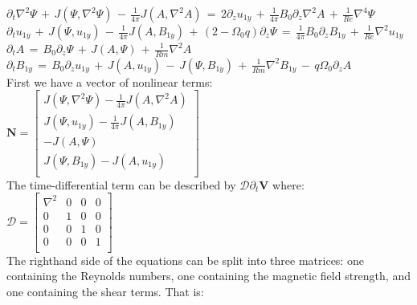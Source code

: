 \documentclass[letterpaper,12pt]{article}
\newcommand\reye{\mathrel{Re}}
\newcommand\reym{\mathrel{Rm}}
\begin{document}
$\partial_t \nabla^2 \Psi \, + \, J\left(\Psi, \nabla^2 \Psi\right) \, - \, \frac{1}{4\pi}J\left(A, \nabla^2 A \right) \, =  \, 2 \partial_z u_{1y} \,+ \, \frac{1}{4\pi} B_0 \partial_z \nabla^2 A \, + \, \frac{1}{\reye}\nabla^4 \Psi$ \\

$\partial_t u_{1y} \, + \, J\left(\Psi, u_{1y}\right) \, - \, \frac{1}{4\pi} J\left(A, B_{1y}\right) \, + \, \left(2 - \Omega_0 q\right) \partial_z \Psi \, = \, \frac{1}{4\pi}B_0\partial_z B_{1y} \, + \, \frac{1}{\reye} \nabla^2 u_{1y}$ \\

$\partial_t A \, = \, B_0 \partial_z \Psi \, + \, J\left(A, \Psi\right) \, + \, \frac{1}{Rm} \nabla^2 A$ \\

$\partial_t B_{1y} \, = \, B_0 \partial_z u_{1y} \, + \, J\left(A, u_{1y}\right) \, - \, J\left(\Psi, B_{1y}\right) \, + \, \frac{1}{\reym} \nabla^2 B_{1y}  \, - \, q \Omega_0 \partial_z A$ \\

First we have a vector of nonlinear terms:\\

$\mathbf{N} = \left[ \begin{matrix}  J(\Psi, \nabla^2 \Psi) - \frac{1}{4\pi}J(A, \nabla^2 A)\\
J(\Psi, u_{1y}) - \frac{1}{4\pi} J(A, B_{1y}) \\ 
-J(A, \Psi) \\
J(\Psi, B_{1y}) - J(A, u_{1y}) \\
\end{matrix} \right]$ \\

The time-differential term can be described by $\mathcal{D}\partial_t \mathbf{V}$ where: \\

$\mathcal{D} = \left[\begin{matrix}
\nabla^2 & 0 & 0 & 0 \\
0 & 1& 0 & 0 \\
0 & 0 & 1 & 0\\
0 & 0 & 0 & 1 \\
\end{matrix}\right]$ \\

The righthand side of the equations can be split into three matrices: one containing the Reynolds numbers, one containing the magnetic field strength, and one containing the shear terms. That is: \\
\end{document}
